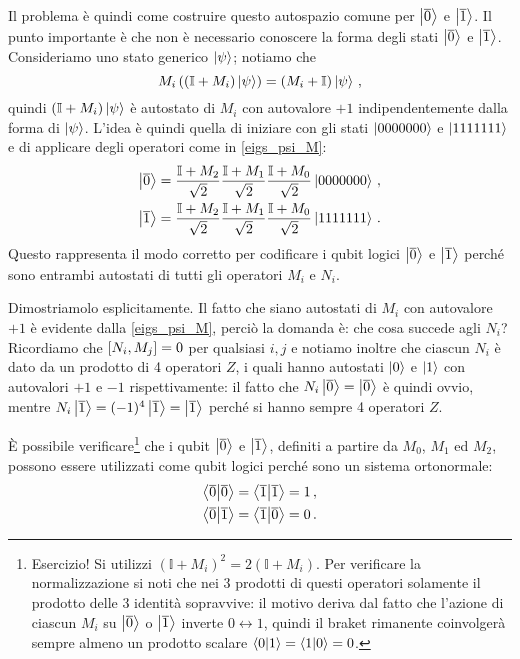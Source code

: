 \noindent Il problema è quindi come costruire questo autospazio comune per $\ket{\overline 0}$ e $\ket{\overline 1}$. Il punto importante è che non è necessario conoscere la forma degli stati $\ket{\overline 0}$ e $\ket{\overline 1}$. Consideriamo uno stato generico $\ket{\psi}$; notiamo che
\begin{equation}\label{eigs_psi_M}
    M_i\left( (\mathbb{I}+M_i) \ket \psi \right) = (M_i+\mathbb{I}) \ket{\psi} \, ,
\end{equation}
quindi $(\mathbb{I}+M_i) \ket \psi$ è autostato di $M_i$ con autovalore $+1$ indipendentemente dalla forma di $\ket{\psi}$. L'idea è quindi quella di iniziare con gli stati $\ket{0000000}$ e $\ket{1111111}$ e di applicare degli operatori come in \eqref{eigs_psi_M}:
\begin{align*}
    \ket{\overline 0} &= \frac{\mathbb{I}+M_2}{\sqrt 2}\frac{\mathbb{I}+M_1}{\sqrt 2}\frac{\mathbb{I}+M_0}{\sqrt 2}\ket{0000000} \, , \\
    \ket{\overline 1} &= \frac{\mathbb{I}+M_2}{\sqrt 2}\frac{\mathbb{I}+M_1}{\sqrt 2}\frac{\mathbb{I}+M_0}{\sqrt 2}\ket{1111111} \, .
\end{align*}
Questo rappresenta il modo corretto per codificare i qubit logici $\ket{ \overline{0}}$ e $\ket{\overline{1}}$ perché sono entrambi autostati di tutti gli operatori $M_i$ e $N_i$. 

\noindent Dimostriamolo esplicitamente. Il fatto che siano autostati di $M_i$ con autovalore $+1$ è evidente dalla \eqref{eigs_psi_M}, perciò la domanda è: che cosa succede agli $N_i$? Ricordiamo che $\comm{N_i}{M_j} = 0$ per qualsiasi $i,j$ e notiamo inoltre che ciascun $N_i$ è dato da un prodotto di 4 operatori $Z$, i quali hanno autostati $\ket{0}$ e $\ket{1}$ con autovalori $+1$ e $-1$ rispettivamente: il fatto che $N_i \ket{\overline{0}} = \ket{\overline{0}}$ è quindi ovvio, mentre $N_i \ket{\overline{1}} = (-1)^4 \ket{\overline{1}} = \ket{\overline{1}}$ perché si hanno sempre 4 operatori $Z$. 

\noindent È possibile verificare\footnote{Esercizio! Si utilizzi $(\mathbb{I} + M_i)^2 = 2(\mathbb{I} + M_i)$. Per verificare la normalizzazione si noti che nei 3 prodotti di questi operatori solamente il prodotto delle 3 identità sopravvive: il motivo deriva dal fatto che l'azione di ciascun $M_i$ su $\ket{\overline{0}}$ o $\ket{\overline{1}}$ inverte $0 \leftrightarrow 1$, quindi il braket rimanente coinvolgerà sempre almeno un prodotto scalare $\braket{0}{1} = \braket{1}{0} = 0$.} che i qubit $\ket{\overline 0}$ e $\ket{\overline 1}$, definiti a partire da $M_0$, $M_1$ ed $M_2$, possono essere utilizzati come qubit logici perché sono un sistema ortonormale:
\begin{align*}
    \ip{\overline 0}{\overline 0}=\ip{\overline 1}{\overline 1}=1 \, ,\\
    \ip{\overline 0}{\overline 1}=\ip{\overline 1}{\overline 0}=0 \, .
\end{align*}

